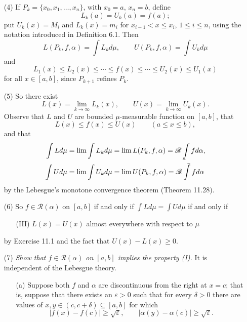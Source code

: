 \documentclass{article}
\def\upint{\mathchoice%
    {\mkern13mu\overline{\vphantom{\intop}\mkern7mu}\mkern-20mu}%
    {\mkern7mu\overline{\vphantom{\intop}\mkern7mu}\mkern-14mu}%
    {\mkern7mu\overline{\vphantom{\intop}\mkern7mu}\mkern-14mu}%
    {\mkern7mu\overline{\vphantom{\intop}\mkern7mu}\mkern-14mu}%
  \int}
\def\lowint{\mkern3mu\underline{\vphantom{\intop}\mkern7mu}\mkern-10mu\int}
\begin{document}
\begin{enumerate}
\item[(4)]
  If $P_k = \{ x_0, x_1, \ldots, x_n \}$, with $x_0 = a$, $x_n = b$, define
  \[
    L_k(a) = U_k(a) = f(a);
  \]
  put $U_k(x) = M_i$ and $L_k(x) = m_i$ for $x_{i-1} < x \leq x_{i}$, $1 \leq i \leq n$,
  using the notation introduced in Definition 6.1.
  Then
  \[
    L(P_k,f,\alpha) = \int L_k d\mu,
    \qquad
    U(P_k,f,\alpha) = \int U_k d\mu
  \]
  and
  \[
    L_1(x) \leq L_2(x) \leq \cdots \leq f(x) \leq \cdots \leq U_2(x) \leq U_1(x)
  \]
  for all $x \in [a,b]$, since $P_{k+1}$ refines $P_k$.

\item[(5)]
  So there exist
  \[
    L(x) = \lim_{k \to \infty} L_k(x),
    \qquad
    U(x) = \lim_{k \to \infty} U_k(x).
  \]
  Observe that $L$ and $U$ are bounded $\mu$-measurable function on $[a,b]$,
  that
  \[
    L(x) \leq f(x) \leq U(x)
    \qquad
    (a \leq x \leq b),
  \]
  and that
  \begin{align*}
    \int L d\mu &= \lim \int L_k d\mu = \lim L(P_k,f,\alpha) = \mathscr{R}\lowint f d\alpha, \\
    \int U d\mu &= \lim \int U_k d\mu = \lim U(P_k,f,\alpha) = \mathscr{R}\upint f d\alpha
  \end{align*}
  by the Lebesgue's monotone convergence theorem (Theorem 11.28).

\item[(6)]
  So $f \in \mathscr{R}(\alpha)$ on $[a,b]$
  if and only if
  $\int L d\mu = \int U d\mu$
  if and only if
  \begin{enumerate}
  \item[(III)]
    $L(x) = U(x)$ almost everywhere with respect to $\mu$
  \end{enumerate}
  by Exercise 11.1 and the fact that $U(x) - L(x) \geq 0$.

\item[(7)]
  \emph{Show that $f \in \mathscr{R}(\alpha)$ on $[a,b]$ implies the property (I).}
  It is independent of the Lebesgue theory.
  \begin{enumerate}
  \item[(a)]
    Suppose both $f$ and $\alpha$ are discontinuous from the right at $x = c$;
    that is,
    suppose that there exists an $\varepsilon > 0$ such that for every $\delta > 0$
    there are values of $x, y \in (c,c+\delta) \subseteq [a,b]$ for which
    \[
      |f(x)-f(c)| \geq \sqrt{\varepsilon},
      \qquad
      |\alpha(y)-\alpha(c)| \geq \sqrt{\varepsilon}.
    \]


\end{enumerate}
\end{enumerate}
\end{document}
